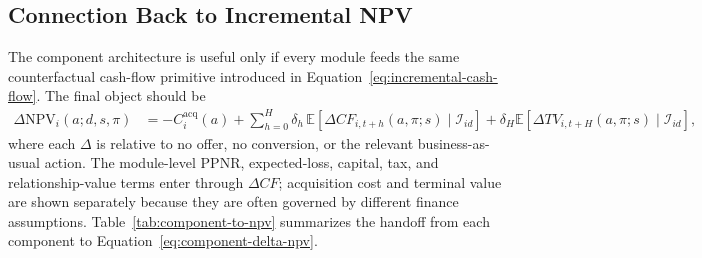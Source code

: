 \documentclass[11pt]{article}
\newcommand{\E}{\mathbb{E}}
\newcommand{\NPV}{\mathrm{NPV}}
\newcommand{\1}{\mathbf{1}}
\begin{document}
\subsection{Connection Back to Incremental NPV}
\label{subsec:component-to-npv}

The component architecture is useful only if every module feeds the same
counterfactual cash-flow primitive introduced in
Equation~\eqref{eq:incremental-cash-flow}. The final object should be
\begin{align}
  \Delta \NPV_i(a;d,s,\pi)
  &=
  - C_i^{\mathrm{acq}}(a)
  +
  \sum_{h=0}^{H}
  \delta_h\,
  \E\!\left[
    \Delta CF_{i,t+h}(a,\pi;s)
    \mid \mathcal{I}_{id}
  \right]
  +
  \delta_H
  \E\!\left[
    \Delta TV_{i,t+H}(a,\pi;s)
    \mid \mathcal{I}_{id}
  \right],
  \label{eq:component-delta-npv}
\end{align}
where each $\Delta$ is relative to no offer, no conversion, or the relevant
business-as-usual action. The module-level PPNR, expected-loss, capital, tax,
and relationship-value terms enter through $\Delta CF$; acquisition cost and
terminal value are shown separately because they are often governed by
different finance assumptions. Table~\ref{tab:component-to-npv} summarizes the
handoff from each component to Equation~\eqref{eq:component-delta-npv}.
\end{document}
